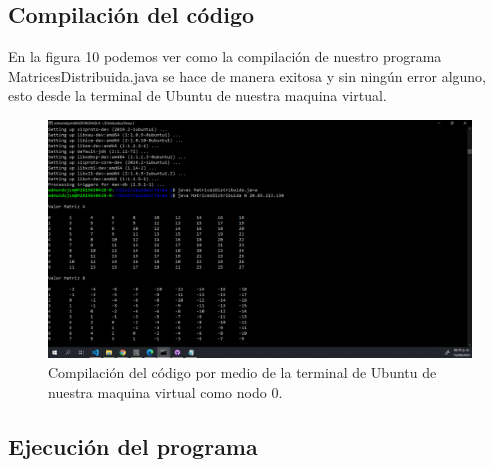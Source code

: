 \documentclass[11pt]{article}
\begin{document}
		\subsection{Compilación del código}
		En la figura 10 podemos ver como la compilación de nuestro programa MatricesDistribuida.java se hace de manera exitosa y sin ningún error alguno, esto desde la terminal de Ubuntu de nuestra maquina virtual.
		\begin{figure}[H]
			\centering
			\includegraphics[scale=0.34]{resources/inicioNodo0.png}
			\caption{Compilación del código por medio de la terminal de Ubuntu de nuestra maquina virtual como nodo 0. }\label{fig:picture}
		\end{figure}
		\subsection{Ejecución del programa}
\end{document}
